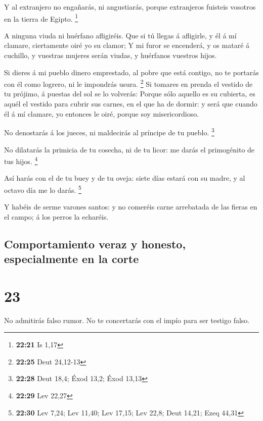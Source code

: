  Y al extranjero no engañarás, ni angustiarás, porque
extranjeros fuisteis vosotros en la tierra de Egipto. \footnote{\textbf{22:21}
  Is 1,17}

 A ninguna viuda ni huérfano afligiréis.  Que
si tú llegas á afligirle, y él á mí clamare, ciertamente oiré yo su
clamor;  Y mi furor se encenderá, y os mataré á cuchillo, y
vuestras mujeres serán viudas, y huérfanos vuestros hijos.

 Si dieres á mi pueblo dinero emprestado, al pobre que está
contigo, no te portarás con él como logrero, ni le impondrás usura.
\footnote{\textbf{22:25} Deut 24,12-13}  Si tomares en
prenda el vestido de tu prójimo, á puestas del sol se lo volverás:
 Porque sólo aquello es su cubierta, es aquél el vestido
para cubrir sus carnes, en el que ha de dormir: y será que cuando él á
mí clamare, yo entonces le oiré, porque soy misericordioso.

 No denostarás á los jueces, ni maldecirás al príncipe de
tu pueblo. \footnote{\textbf{22:28} Deut 18,4; Éxod 13,2; Éxod 13,13}

 No dilatarás la primicia de tu cosecha, ni de tu licor: me
darás el primogénito de tus hijos. \footnote{\textbf{22:29} Lev 22,27}

 Así harás con el de tu buey y de tu oveja: siete días
estará con su madre, y al octavo día me lo darás. \footnote{\textbf{22:30}
  Lev 7,24; Lev 11,40; Lev 17,15; Lev 22,8; Deut 14,21; Ezeq 44,31}

 Y habéis de serme varones santos: y no comeréis carne
arrebatada de las fieras en el campo; á los perros la echaréis.

\hypertarget{comportamiento-veraz-y-honesto-especialmente-en-la-corte}{%
\subsection{Comportamiento veraz y honesto, especialmente en la
corte}\label{comportamiento-veraz-y-honesto-especialmente-en-la-corte}}

\hypertarget{section-22}{%
\section{23}\label{section-22}}

 No admitirás falso rumor. No te concertarás con el impío
para ser testigo falso.

